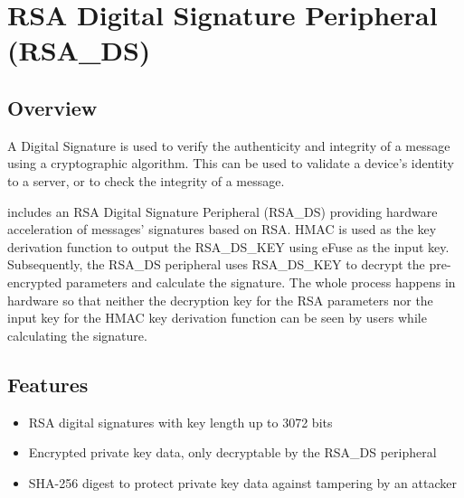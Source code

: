 \documentclass[main\_\_EN.tex]{subfiles}
\begin{document}

\ifglobal
\else
    {\let\clearpage\relax \listoftodos}
    \tableofcontents
\fi



\chapter{RSA Digital Signature Peripheral (RSA\_DS)}
\label{mod:digsig}
\hypertarget{digsig}{}\hypertarget{rsads}{}

\section{Overview}


A Digital Signature is used to verify the authenticity and integrity of a message using a cryptographic algorithm. This can be used to validate a device's identity to a server, or to check the integrity of a message.

\chipname{} includes an RSA Digital Signature Peripheral (RSA\_DS) providing hardware acceleration of messages' signatures based on RSA. HMAC is used as the key derivation function to output the RSA\_DS\_KEY using eFuse as the input key. Subsequently, the RSA\_DS peripheral uses RSA\_DS\_KEY to decrypt the pre-encrypted parameters and calculate the signature. The whole process happens in hardware so that neither the decryption key for the RSA parameters nor the input key for the HMAC key derivation function can be seen by users while calculating the signature. 

\section{Features}

\begin{itemize}
\item RSA digital signatures with key length up to 3072 bits
\item Encrypted private key data, only decryptable by the RSA\_DS peripheral
\item SHA-256 digest to protect private key data against tampering by an attacker
\end{itemize}
\end{document}

